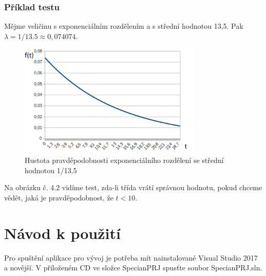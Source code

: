 \documentclass[FM,RP]{tulthesis}
\begin{document}
        \subsection*{Příklad testu}
            Mějme veličinu s exponenciálním rozdělením a s střední hodnotou 13,5. Pak $\lambda = 1 / 13.5 \approx 0,074074 $.

        \begin{figure}
            \begin{center}
                \includegraphics[width=250pt]{pic/testHustota.png}
                \caption{Hustota pravděpodobnosti exponenciálního rozdělení se střední hodnotou 1/13.5}
            \end{center}
        \end{figure}

            Na obrázku č. 4.2 vidíme test, zda-li třída vrátí správnou hodnotu, pokud chceme vědět, jaká je pravděpodobnost, že $ t < 10 $.


\chapter{Návod k použití}

    Pro spuštění aplikace pro vývoj je potřeba mít nainstalované Visual Studio 2017 a novější. 
    V přiloženém CD ve složce SpecianPRJ spusťte soubor SpecianPRJ.sln. 
\end{document}
